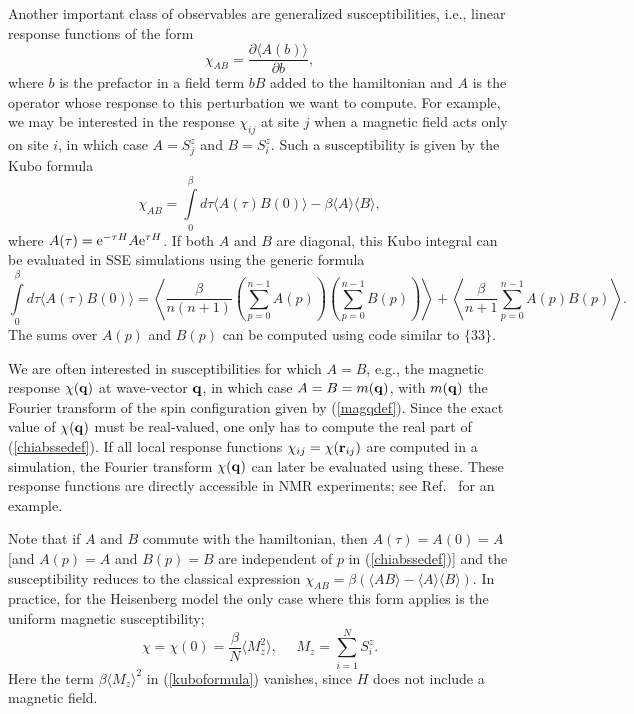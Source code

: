 \documentclass[draft,numberedheadings]{aipproc}
\begin{document}
Another important class of observables are generalized susceptibilities, i.e., linear response functions of the form
\begin{equation}
\chi_{AB}=\frac{\partial \langle A(b)\rangle}{\partial b},
\end{equation}
where $b$ is the prefactor in a field term $bB$ added to the hamiltonian and $A$ is the operator whose response to this perturbation we want to compute. 
For example, we may be interested in the response $\chi_{ij}$ at site $j$ when a magnetic field acts only on site $i$, in which case $A=S^z_j$ and $B=S^z_i$. 
Such a susceptibility is given by the Kubo formula \cite{sandvik90}
\begin{equation}
\chi_{AB}=\int\limits_0^\beta d\tau \langle A(\tau)B(0)\rangle - \beta \langle A\rangle\langle B\rangle,
\label{kuboformula}
\end{equation}
where $A(\tau)={\rm e}^{-\tau H}A{\rm e}^{\tau H}$. If both $A$ and $B$ are diagonal, this Kubo integral can be evaluated in SSE simulations using the 
generic formula
\begin{equation}
\int\limits_0^\beta d\tau \langle A(\tau)B(0)\rangle=\left \langle \frac{\beta}{n(n+1)}\left ( \sum_{p=0}^{n-1}A(p) \right )\left ( \sum_{p=0}^{n-1}B(p) 
\right )\right \rangle + \left \langle \frac{\beta}{n+1}\sum_{p=0}^{n-1}A(p)B(p) \right \rangle.
\label{chiabssedef}
\end{equation}
The sums over $A(p)$ and $B(p)$ can be computed using code similar to $\{33\}$. 

We are often interested in susceptibilities for which $A=B$, e.g., the magnetic response $\chi({\bf q})$ at wave-vector ${\bf q}$, in which case 
$A=B=m({\bf q})$, with $m({\bf q})$ the Fourier transform of the spin configuration given by (\ref{magqdef}). Since the exact value of $\chi({\bf q})$ 
must be real-valued, one only has to compute the real part of (\ref{chiabssedef}). If all local response functions $\chi_{ij}=\chi({\bf r}_{ij})$ are 
computed in a simulation, the Fourier transform $\chi({\bf q})$ can later be evaluated using these. These response functions are directly accessible in 
NMR experiments; see Ref.~\cite{sandvik95} for an example.

Note that if $A$ and $B$ commute with the hamiltonian, then $A(\tau)=A(0)=A$ [and $A(p)=A$ and $B(p)=B$ are independent of $p$ in (\ref{chiabssedef})] 
and the susceptibility reduces to the classical expression $\chi_{AB}=\beta(\langle AB\rangle-\langle A\rangle\langle B\rangle)$. In practice, for the
Heisenberg model the only case where this form applies is the uniform magnetic susceptibility;
\begin{equation}
\chi=\chi(0)=\frac{\beta}{N}\langle M_z^2\rangle,~~~~~~M_z=\sum_{i=1}^N S^z_i.
\label{chi0sse}
\end{equation}
Here the term $\beta\langle M_z\rangle^2$ in (\ref{kuboformula}) vanishes, since $H$ does not include a magnetic field.
\end{document}
